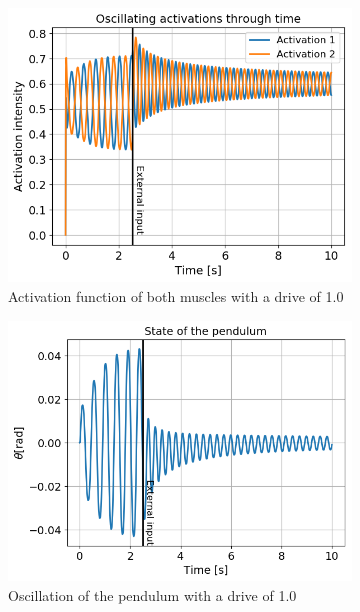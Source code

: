 \documentclass{cmc}
\begin{document}
\begin{figure}[H]
  \begin{subfigure}[b]{0.3\textwidth}
     \centering
      \includegraphics[width=\textwidth]{figures/3_b_1dot0_activations.png}
    \caption{Activation function of both muscles with a drive of 1.0}
    \label{fig:3b_output}
  \end{subfigure}
  \begin{subfigure}[b]{0.3\textwidth}
     \centering
      \includegraphics[width=\textwidth]{figures/3_b_1dot0_state.png}
    \caption{Oscillation of the pendulum with a drive of 1.0}
    \label{fig:3b_phase}
  \end{subfigure}
  \begin{subfigure}[b]{0.3\textwidth}

\end{subfigure}
\end{figure}
\end{document}
